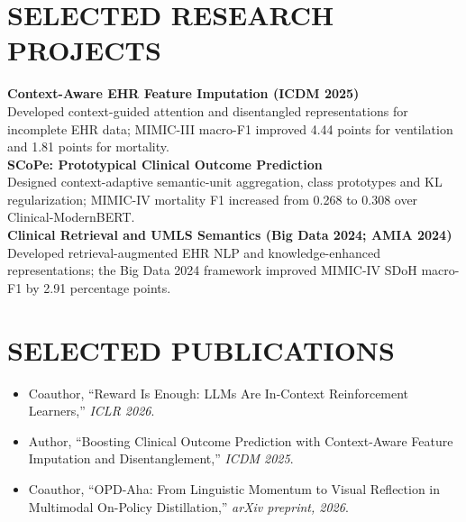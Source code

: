 \documentclass[10pt, letterpaper]{article}
\begin{document}
\section{SELECTED RESEARCH PROJECTS}
\textbf{Context-Aware EHR Feature Imputation (ICDM 2025)}\\[-1pt]
Developed context-guided attention and disentangled representations for incomplete EHR data; MIMIC-III macro-F1 improved 4.44 points for ventilation and 1.81 points for mortality.\\[3pt]
\textbf{SCoPe: Prototypical Clinical Outcome Prediction}\\[-1pt]
Designed context-adaptive semantic-unit aggregation, class prototypes and KL regularization; MIMIC-IV mortality F1 increased from 0.268 to 0.308 over Clinical-ModernBERT.\\[3pt]
\textbf{Clinical Retrieval and UMLS Semantics (Big Data 2024; AMIA 2024)}\\[-1pt]
Developed retrieval-augmented EHR NLP and knowledge-enhanced representations; the Big Data 2024 framework improved MIMIC-IV SDoH macro-F1 by 2.91 percentage points.\\[3pt]
\section{SELECTED PUBLICATIONS}
\begin{itemize}
\item Coauthor, ``Reward Is Enough: LLMs Are In-Context Reinforcement Learners,'' \textit{ICLR 2026}.
\item Author, ``Boosting Clinical Outcome Prediction with Context-Aware Feature Imputation and Disentanglement,'' \textit{ICDM 2025}.
\item Coauthor, ``OPD-Aha: From Linguistic Momentum to Visual Reflection in Multimodal On-Policy Distillation,'' \textit{arXiv preprint, 2026}.
\end{itemize}
\end{document}

